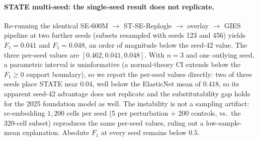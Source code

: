 \documentclass{article}
\theoremstyle{plain}
\theoremstyle{definition}
\theoremstyle{remark}
\begin{document}
\paragraph{STATE multi-seed: the single-seed result does not replicate.}
\label{sec:state-multi-seed}
Re-running the identical SE-600M $\to$ ST-SE-Replogle $\to$ overlay $\to$ GIES pipeline at two further seeds (subsets resampled with seeds 123 and 456) yields $F_1 = 0.041$ and $F_1 = 0.048$, an order of magnitude below the seed-42 value. The three per-seed values are $[0.462, 0.041, 0.048]$. With $n=3$ and one outlying seed, a parametric interval is uninformative (a normal-theory CI extends below the $F_1{\geq}0$ support boundary), so we report the per-seed values directly: two of three seeds place STATE near $0.04$, well below the ElasticNet mean of $0.418$, so its apparent seed-42 advantage does not replicate and the substitutability gap holds for the 2025 foundation model as well. The instability is not a sampling artifact: re-embedding $1{,}200$ cells per seed (5 per perturbation $+$ 200 controls, vs.\ the 320-cell subset) reproduces the same per-seed values, ruling out a low-sample-mean explanation. Absolute $F_1$ at every seed remains below $0.5$.
\end{document}

